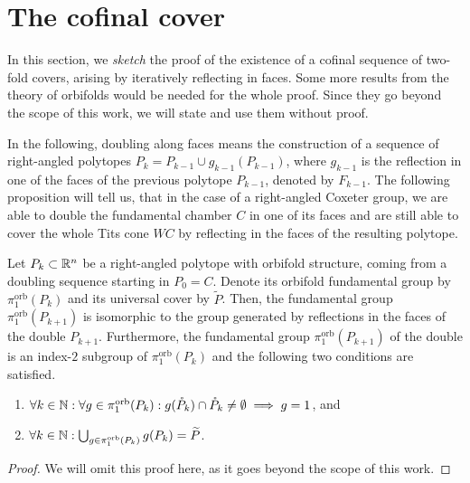 \section{The cofinal cover}

In this section, we \emph{sketch} the proof of the existence of a cofinal sequence of two-fold covers, arising by iteratively reflecting in faces.
Some more results from the theory of orbifolds would be needed for the whole proof.
Since they go beyond the scope of this work, we will state and use them without proof.

In the following, doubling along faces means the construction of a sequence of right-angled polytopes \(P_k = P_{k-1} \cup g_{k-1}(P_{k-1})\), where \(g_{k-1}\) is the reflection in one of the faces of the previous polytope \(P_{k-1}\), denoted by \(F_{k-1}\).
The following proposition will tell us, that in the case of a right-angled Coxeter group, we are able to double the fundamental chamber \(C\) in one of its faces and are still able to cover the whole Tits cone \(WC\) by reflecting in the faces of the resulting polytope.

\begin{proposition}\label{prop:double}
    Let \(P_k \subset \mathbb{R}^n\) be a right-angled polytope with orbifold structure, coming from a doubling sequence starting in \(P_0 = C\).
    Denote its orbifold fundamental group by \(\pi_1^{\text{orb}}(P_k)\) and its universal cover by \(\widetilde{P}\).
    Then, the fundamental group \(\pi_1^{\text{orb}}(P_{k+1})\) is isomorphic to the group generated by reflections in the faces of the double \(P_{k+1}\).
    Furthermore, the fundamental group \(\pi_1^{\text{orb}}(P_{k+1})\) of the double is an index-\(2\) subgroup of \(\pi_1^{\text{orb}}(P_k)\) and the following two conditions are satisfied.
    \begin{enumerate}
        \item \(\forall k \in \mathbb{N}: \forall g \in \pi_1^{\text{orb}}(P_k): g(\mathring{P}_k) \cap \mathring{P}_k \neq \emptyset \implies g = 1\), and
        \item \(\forall k \in \mathbb{N}: \bigcup_{g \in \pi_1^{\text{orb}}(P_k)} g(P_{k}) = \widetilde{P}\).
    \end{enumerate}
\end{proposition}
\begin{proof}
    We will omit this proof here, as it goes beyond the scope of this work.
\end{proof}

